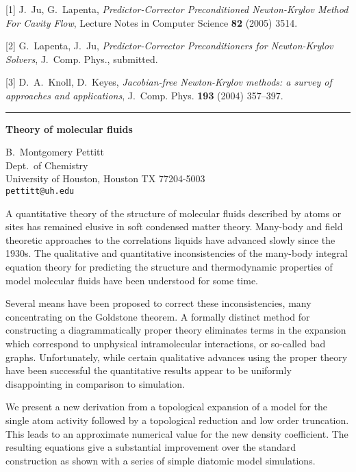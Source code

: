 \documentclass[twosided]{report}
\begin{document}
[1] J.~Ju, G.~Lapenta,
{\em Predictor-Corrector Preconditioned Newton-Krylov Method
For Cavity Flow}, Lecture Notes in Computer Science
{\bf 82} (2005) 3514.

[2] G.~Lapenta, J.~Ju, {\em Predictor-Corrector
Preconditioners for Newton-Krylov Solvers},
J.~Comp. Phys., submitted.

[3] D.~A.~Knoll, D.~Keyes,
{\em Jacobian-free Newton-Krylov methods: a survey of
approaches and applications}, J.~Comp. Phys. {\bf 193}
(2004) 357--397.



	\begin{center} \rule{6in}{1pt} \end{center}

\begin{center}
{\large			%
{\bf Theory of molecular fluids}}

	B.~Montgomery Pettitt \\
	Dept.~of Chemistry \\
	University of Houston, Houston TX 77204-5003 \\
	{\tt pettitt@uh.edu} \\
\end{center}
A quantitative theory of the structure of molecular fluids
described by atoms or sites has remained elusive in soft
condensed matter theory. Many-body and field theoretic
approaches to the correlations liquids have advanced slowly
since the 1930s. The qualitative and quantitative
inconsistencies of the many-body integral equation theory
for predicting the structure and thermodynamic properties of
model molecular fluids have been understood for some time.

Several means have been proposed to correct these
inconsistencies, many concentrating on the Goldstone
theorem. A formally distinct method for constructing a
diagrammatically proper theory eliminates terms in the
expansion which correspond to unphysical intramolecular
interactions, or so-called bad graphs. Unfortunately, while
certain qualitative advances using the proper theory have
been successful the quantitative results appear to be
uniformly disappointing in comparison to simulation.

We present a new derivation from a topological expansion of
a model for the single atom activity followed by a
topological reduction and low order truncation. This leads
to an approximate numerical value for the new density
coefficient.  The resulting equations give a substantial
improvement over the standard construction as shown with
a series of simple diatomic model simulations.
\end{document}
